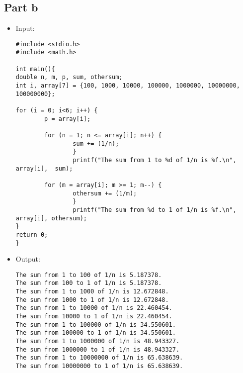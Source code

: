 \documentclass[10pt]{article}
\begin{document}
\subsection{Part b}
\begin{itemize}
\item Input:
\begin{verbatim}
#include <stdio.h>
#include <math.h>

int main(){
double n, m, p, sum, othersum;
int i, array[7] = {100, 1000, 10000, 100000, 1000000, 10000000, 100000000};

for (i = 0; i<6; i++) {
        p = array[i];

        for (n = 1; n <= array[i]; n++) {
                sum += (1/n);
                }
                printf("The sum from 1 to %d of 1/n is %f.\n", array[i],  sum);

        for (m = array[i]; m >= 1; m--) {
                othersum += (1/m);
                }
                printf("The sum from %d to 1 of 1/n is %f.\n", array[i], othersum);
}
return 0;
}
\end{verbatim}
\item Output:
\begin{verbatim}
The sum from 1 to 100 of 1/n is 5.187378.
The sum from 100 to 1 of 1/n is 5.187378.
The sum from 1 to 1000 of 1/n is 12.672848.
The sum from 1000 to 1 of 1/n is 12.672848.
The sum from 1 to 10000 of 1/n is 22.460454.
The sum from 10000 to 1 of 1/n is 22.460454.
The sum from 1 to 100000 of 1/n is 34.550601.
The sum from 100000 to 1 of 1/n is 34.550601.
The sum from 1 to 1000000 of 1/n is 48.943327.
The sum from 1000000 to 1 of 1/n is 48.943327.
The sum from 1 to 10000000 of 1/n is 65.638639.
The sum from 10000000 to 1 of 1/n is 65.638639.
\end{verbatim}
\end{itemize}
\end{document}
